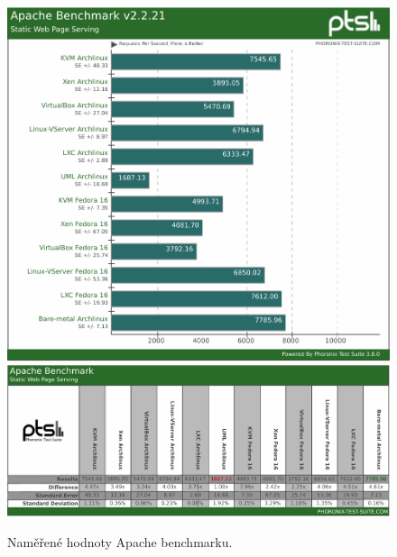 \begin{figure}[h!]
  \centering
  \includegraphics[width=15cm]{obr/bench/apache-graph}
  \includegraphics[width=15cm]{obr/bench/apache-table}
  \caption{Naměřené hodnoty Apache benchmarku.}
  \label{obr:bench:apache}
\end{figure}



